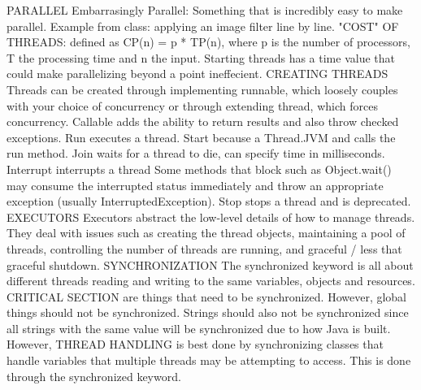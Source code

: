 \documentclass[10pt]{article}
\begin{document}
\begin{landscape}
\begin{multicols*}{6}
PARALLEL
Embarrasingly Parallel: Something that is incredibly easy to make parallel. Example from class: applying an image filter line by line. "COST" OF THREADS: defined as CP(n) = p * TP(n), where p is the number of processors, T the processing time and n the input. Starting threads has a time value that could make parallelizing beyond a point ineffecient. CREATING THREADS Threads can be created through implementing runnable, which loosely couples with your choice of concurrency or through extending thread, which forces concurrency. Callable adds the ability to return results and also throw checked exceptions. Run executes a thread. Start because a Thread.JVM and calls the run method. Join waits for a thread to die, can specify time in milliseconds. Interrupt interrupts a thread Some methods that block such as Object.wait() may consume the interrupted status immediately and throw an appropriate exception (usually InterruptedException). Stop stops a thread and is deprecated. EXECUTORS Executors abstract the low-level details of how to manage threads. They deal with issues such as creating the thread objects, maintaining a pool of threads, controlling the number of threads are running, and graceful / less that graceful shutdown. SYNCHRONIZATION The synchronized keyword is all about different threads reading and writing to the same variables, objects and resources. CRITICAL SECTION are things that need to be synchronized. However, global things should not be synchronized. Strings should also not be synchronized since all strings with the same value will be synchronized due to how Java is built. However, THREAD HANDLING is best done by synchronizing classes that handle variables that multiple threads may be attempting to access. This is done through the synchronized keyword.

\end{multicols*}
\end{landscape}
\end{document}

